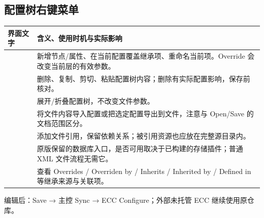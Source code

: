 \subsection*{配置树右键菜单}
\begin{tabularx}{\linewidth}{@{}L{63mm}Y@{}}\toprule
界面文字 & 含义、使用时机与实际影响 \\\midrule
{} & 新增节点/属性、在当前配置覆盖继承项、重命名当前项。Override 会改变当前层的有效参数。\\
 & 删除、复制、剪切、粘贴配置树内容；删除有实际配置影响，保存前核对。\\
 & 展开/折叠配置树，不改变文件参数。\\
 & 将文件内容导入配置或把选定配置导出到文件，注意与 Open/Save 的文档范围区分。\\
 & 添加文件引用，保留依赖关系；被引用资源也应放在完整源目录内。\\
 & 原版保留的数据库入口，是否可用取决于已构建的存储插件；普通 XML 文件流程无需它。\\
 & 查看 Overrides / Overriden by / Inherits / Inherited by / Defined in 等继承来源与关联项。\\
\bottomrule\end{tabularx}
\par{\footnotesize 编辑后：Save → 主控 Sync → ECC Configure；外部未托管 ECC 继续使用原仓库。}

\newpage
{}

